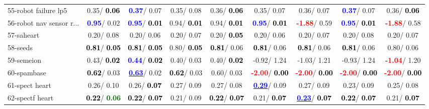 \begin{table}[h]
\begin{center}
\begin{tabular}{lc|c|c|c|c|c|c|c}
55-robot failure lp5 &   0.35/\textcolor{black}{\textbf{  0.06}} & \textcolor{blue}{\textbf{  0.37}}/  0.07 &   0.35/  0.08 &   0.36/\textcolor{black}{\textbf{  0.06}} &   0.35/  0.07 &   0.36/  0.07 & \textcolor{blue}{\textbf{  0.37}}/  0.07 &   0.36/\textcolor{black}{\textbf{  0.06}} \\
56-robot nav sensor r... & \textcolor{blue}{\textbf{  0.95}}/  0.02 & \textcolor{blue}{\textbf{  0.95}}/\textcolor{black}{\textbf{  0.01}} &   0.94/\textcolor{black}{\textbf{  0.01}} &   0.94/\textcolor{black}{\textbf{  0.01}} & \textcolor{blue}{\textbf{  0.95}}/\textcolor{black}{\textbf{  0.01}} & \textcolor{red}{\textbf{ -1.88}}/  0.59 & \textcolor{blue}{\textbf{  0.95}}/\textcolor{black}{\textbf{  0.01}} & \textcolor{red}{\textbf{ -1.88}}/  0.58 \\
57-saheart &   0.20/  0.08 &   0.20/  0.06 &   0.20/  0.07 &   0.20/\textcolor{black}{\textbf{  0.05}} &   0.20/  0.06 &   0.20/  0.07 &   0.20/  0.08 &   0.20/  0.07 \\
58-seeds & \textcolor{black}{\textbf{  0.81}}/\textcolor{black}{\textbf{  0.05}} & \textcolor{black}{\textbf{  0.81}}/\textcolor{black}{\textbf{  0.05}} &   0.80/\textcolor{black}{\textbf{  0.05}} & \textcolor{black}{\textbf{  0.81}}/  0.06 & \textcolor{black}{\textbf{  0.81}}/  0.06 & \textcolor{black}{\textbf{  0.81}}/  0.06 & \textcolor{black}{\textbf{  0.81}}/  0.06 &   0.80/  0.06 \\
59-semeion &   0.43/\textcolor{black}{\textbf{  0.02}} & \textcolor{blue}{\textbf{  0.44}}/\textcolor{black}{\textbf{  0.02}} &   0.40/  0.03 &   0.40/\textcolor{black}{\textbf{  0.02}} &  -0.92/  1.24 &  -1.03/  1.21 &  -0.93/  1.24 & \textcolor{red}{\textbf{ -1.04}}/  1.20 \\
60-spambase & \textcolor{black}{\textbf{  0.62}}/  0.03 & \underline{\textcolor{blue}{\textbf{  0.63}}}/  0.02 & \textcolor{black}{\textbf{  0.62}}/  0.03 &   0.60/  0.03 & \textcolor{red}{\textbf{ -2.00}}/\textcolor{black}{\textbf{  0.00}} & \textcolor{red}{\textbf{ -2.00}}/\textcolor{black}{\textbf{  0.00}} & \textcolor{red}{\textbf{ -2.00}}/\textcolor{black}{\textbf{  0.00}} & \textcolor{red}{\textbf{ -2.00}}/\textcolor{black}{\textbf{  0.00}} \\ \hline
61-spect heart &   0.26/  0.10 &   0.26/\textcolor{black}{\textbf{  0.07}} &   0.27/  0.09 &   0.27/  0.08 & \underline{\textcolor{blue}{\textbf{  0.29}}}/  0.09 &   0.27/  0.09 &   0.23/  0.09 &   0.25/  0.08 \\
62-spectf heart & \textcolor{black}{\textbf{  0.22}}/\textcolor{darkgreen}{\textbf{  0.06}} & \textcolor{black}{\textbf{  0.22}}/\textcolor{black}{\textbf{  0.07}} &   0.21/  0.09 & \textcolor{black}{\textbf{  0.22}}/\textcolor{black}{\textbf{  0.07}} &   0.21/\textcolor{black}{\textbf{  0.07}} & \underline{\textcolor{blue}{\textbf{  0.23}}}/\textcolor{black}{\textbf{  0.07}} & \textcolor{black}{\textbf{  0.22}}/\textcolor{black}{\textbf{  0.07}} &   0.21/\textcolor{black}{\textbf{  0.07}} \\

\end{tabular}
\end{center}
\end{table}
